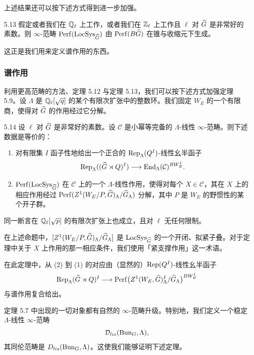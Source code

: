 上述结果还可以按下述方式得到进一步加强。

\begin{thm}{5.13}\label{thm:a3-5-13}
假定或者我们在 $\mathbb{Q}_\ell$ 上工作，或者我们在 $\mathbb{Z}_\ell$ 上工作且 $\ell$ 对 $\widehat{G}$ 是非常好的素数。则 $\infty$-范畴 $\operatorname{Perf}(\operatorname{LocSys}_{\widehat{G}})$ 由 $\operatorname{Perf}(B\widehat{G})$ 在锥与收缩元下生成。
\end{thm}

这正是我们用来定义谱作用的东西。

\subsubsection{谱作用}
利用更高范畴的方法、定理 5.12 与定理 5.13，我们可以按下述方式加强定理 5.9。设 $\Lambda$ 是 $\mathbb{Q}_\ell[\sqrt q]$ 的某个有限次扩张中的整数环。我们固定 $W_E$ 的一个有限商，使得对 $\widehat{G}$ 的作用经过它分解。

\begin{thm}{5.14}\label{thm:a3-5-14}
设 $\ell$ 对 $\widehat{G}$ 是非常好的素数。设 $\mathcal{C}$ 是小幂等完备的 $\Lambda$-线性 $\infty$-范畴。则下述数据是等价的：
\begin{enumerate}[label=(\arabic*),leftmargin=2.6em,itemsep=0.2em]
\item 对有限集 $I$ 函子性地给出一个正合的 $\operatorname{Rep}_\Lambda(Q^I)$-线性幺半函子
\[
\operatorname{Rep}_\Lambda((\widehat{G}\rtimes Q)^I)\longrightarrow \operatorname{End}_\Lambda(\mathcal{C})^{BW_E^I}.
\]
\item $\operatorname{Perf}(\operatorname{LocSys}_{\widehat{G}})$ 在 $\mathcal{C}$ 上的一个 $\Lambda$-线性作用，使得对每个 $X\in\mathcal{C}$，其在 $X$ 上的相应作用经过 $\operatorname{Perf}(Z^1(W_E/P,\widehat{G})_\Lambda/\widehat{G}_\Lambda)$ 分解，其中 $P$ 是 $W_E$ 的野惯性的某个开子群。
\end{enumerate}
\end{thm}

同一断言在 $\mathbb{Q}_\ell[\sqrt p]$ 的有限次扩张上也成立，且对 $\ell$ 无任何限制。

在上述命题中，$[Z^1(W_E/P,\widehat{G})_\Lambda/\widehat{G}_\Lambda]$ 是 $\operatorname{LocSys}_{\widehat{G}}$ 的一个开闭、拟紧子叠。对于定理中关于 $X$ 上作用的那一相应条件，我们使用「紧支撑作用」这一术语。

在此定理中，从 (2) 到 (1) 的对应由（显然的）$\operatorname{Rep}(Q^I)$-线性幺半函子
\[
\operatorname{Rep}_\Lambda(\widehat{G}\rtimes Q)^I\longrightarrow \operatorname{Perf}\bigl(Z^1(W_E,\widehat{G})^I_\Lambda/\widehat{G}_\Lambda\bigr)^{BW_E^I}
\]
与谱作用复合给出。

定理 5.7 中出现的一切对象都有自然的 $\infty$-范畴升级。特别地，我们定义一个稳定 $\Lambda$-线性 $\infty$-范畴
\[
\mathcal{D}_{lis}(\operatorname{Bun}_G,\Lambda),
\]
其同伦范畴是 $D_{lis}(\operatorname{Bun}_G,\Lambda)$。这使我们能够证明下述定理。

